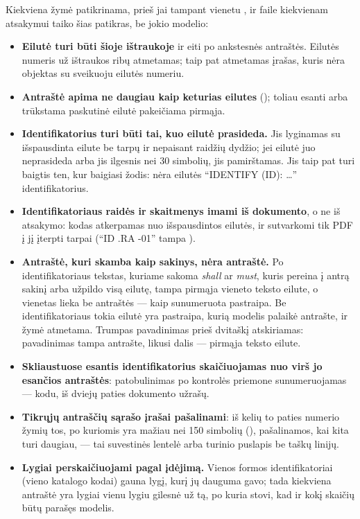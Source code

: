 \begin{codebox}{Kiekviena žymė patikrinama, prieš jai tampant vienetu}
,  ir  faile  kiekvienam
atsakymui taiko šias patikras, be jokio modelio:
\begin{itemize}
  \item \textbf{Eilutė turi būti šioje ištraukoje} ir eiti po ankstesnės antraštės. Eilutės
    numeris už ištraukos ribų atmetamas; taip pat atmetamas įrašas, kuris nėra objektas su
    sveikuoju eilutės numeriu.
  \item \textbf{Antraštė apima ne daugiau kaip keturias eilutes} ();
    toliau esanti arba trūkstama paskutinė eilutė pakeičiama pirmąja.
  \item \textbf{Identifikatorius turi būti tai, kuo eilutė prasideda.} Jis lyginamas su
    išspausdinta eilute be tarpų ir nepaisant raidžių dydžio; jei eilutė juo neprasideda arba
    jis ilgesnis nei 30 simbolių, jis pamirštamas. Jis taip pat turi baigtis ten, kur baigiasi
    žodis:  nėra eilutės \enquote{IDENTIFY (ID): …} identifikatorius.
  \item \textbf{Identifikatoriaus raidės ir skaitmenys imami iš dokumento}, o ne iš atsakymo:
    kodas atkerpamas nuo išspausdintos eilutės, ir sutvarkomi tik PDF į jį įterpti tarpai
    (\enquote{ID .RA -01} tampa ).
  \item \textbf{Antraštė, kuri skamba kaip sakinys, nėra antraštė.} Po identifikatoriaus
    tekstas, kuriame sakoma \emph{shall} ar \emph{must}, kuris pereina į antrą sakinį arba
    užpildo visą eilutę, tampa pirmąja vieneto teksto eilute, o vienetas lieka be antraštės ---
    kaip sunumeruota pastraipa. Be identifikatoriaus tokia eilutė yra pastraipa, kurią modelis
    palaikė antrašte, ir žymė atmetama. Trumpas pavadinimas prieš dvitaškį atskiriamas:
    pavadinimas tampa antrašte, likusi dalis --- pirmąja teksto eilute.
  \item \textbf{Skliaustuose esantis identifikatorius skaičiuojamas nuo virš jo esančios
    antraštės}: patobulinimas  po kontrolės priemone  sunumeruojamas
     --- kodu, iš dviejų paties dokumento užrašų.
  \item \textbf{Tikrųjų antraščių sąrašo įrašai pašalinami}: iš kelių to paties numerio žymių
    tos, po kuriomis yra mažiau nei 150 simbolių (), pašalinamos, kai
    kita turi daugiau, --- tai suvestinės lentelė arba turinio puslapis be taškų linijų.
  \item \textbf{Lygiai perskaičiuojami pagal įdėjimą.} Vienos formos identifikatoriai (vieno
    katalogo kodai) gauna lygį, kurį jų dauguma gavo; tada kiekviena antraštė yra lygiai vienu
    lygiu gilesnė už tą, po kuria stovi, kad ir kokį skaičių būtų parašęs modelis.
\end{itemize}
\end{codebox}

